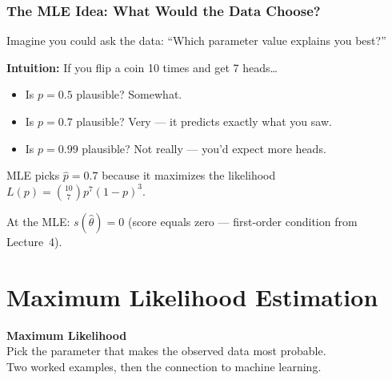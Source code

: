 \documentclass[aspectratio=169]{beamer}
\begin{document}
\begin{frame}
\frametitle{The MLE Idea: What Would the Data Choose?}

\small
Imagine you could ask the data: ``Which parameter value explains you best?''

\vspace{0.2cm}
\begin{center}
\end{center}

\vspace{0.2cm}
\pause
\textbf{Intuition:} If you flip a coin 10 times and get 7 heads\ldots
\begin{itemize}\setlength{\itemsep}{2pt}
  \item Is $p = 0.5$ plausible? Somewhat.
  \item Is $p = 0.7$ plausible? Very --- it predicts exactly what you saw.
  \item Is $p = 0.99$ plausible? Not really --- you'd expect more heads.
\end{itemize}

\vspace{0.1cm}
MLE picks $\hat{p} = 0.7$ because it maximizes the likelihood $L(p) = \binom{10}{7}p^7(1-p)^3$.

\vspace{0.1cm}
\centering\small At the MLE: $s(\hat\theta) = 0$ (score equals zero --- first-order condition from Lecture~4).
\end{frame}

\section{Maximum Likelihood Estimation}

\begin{frame}
\begin{center}
  \vspace{1.5cm}
  {\Huge\bfseries\textcolor{popblue}{Maximum Likelihood}}\\[12pt]
  {\large Pick the parameter that makes the observed data most probable.}\\[8pt]
  {\normalsize Two worked examples, then the connection to machine learning.}
\end{center}
\end{frame}
\end{document}
